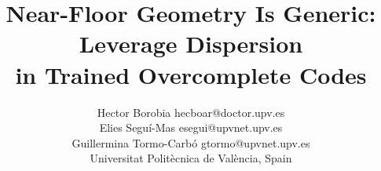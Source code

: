 \documentclass{article}
\title{Near-Floor Geometry Is Generic: Leverage Dispersion\\in Trained Overcomplete Codes}
\author{\name Hector Borobia \email hecboar@doctor.upv.es \\
  \AND
  \name Elies Segu\'i-Mas \email esegui@upvnet.upv.es \\
  \AND
  \name Guillermina Tormo-Carb\'o \email gtormo@upvnet.upv.es \\
  \addr Universitat Polit\`ecnica de Val\`encia, Spain}
\theoremstyle{definition}
\begin{document}
\maketitle

\begin{abstract}

\end{abstract}




















\appendix















\end{document}
